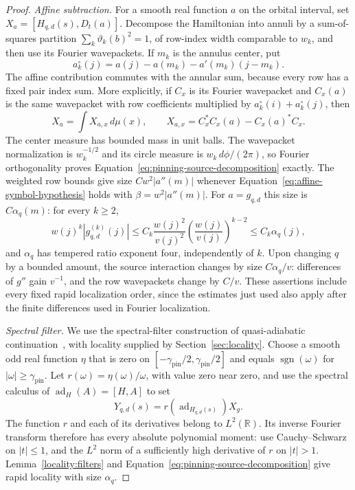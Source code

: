 \begin{proof}
\emph{Affine subtraction.}
For a smooth real
function $a$ on the orbital interval, set
$X_a=[H_{q,d}(s),D_t(a)]$.  Decompose the Hamiltonian into annuli by a
sum-of-squares partition $\sum_k\vartheta_k(b)^2=1$, of row-index width
comparable to $w_k$, and then use its Fourier wavepackets.  If $m_k$ is
the annulus center, put
\[
 a_k^\circ(j)=a(j)-a(m_k)-a'(m_k)(j-m_k).
\]
The affine contribution commutes with the annular sum, because every row
has a fixed pair index sum.  More explicitly, if $C_x$ is its Fourier
wavepacket and $C_x(a)$ is the same wavepacket with row coefficients
multiplied by $a_k^\circ(i)+a_k^\circ(j)$, then
\begin{equation}
 X_a=\int X_{a,x}\,d\mu(x),\qquad
 X_{a,x}=C_x^*C_x(a)-C_x(a)^*C_x.
 \label{eq:pinning-source-decomposition}
\end{equation}
The center measure has bounded mass in unit balls.  The wavepacket
normalization is $w_k^{-1/2}$ and its circle measure is
$w_k\,d\phi/(2\pi)$, so Fourier orthogonality proves
Equation~\eqref{eq:pinning-source-decomposition} exactly.
The weighted row bounds give size $Cw^2|a''(m)|$ whenever
Equation~\eqref{eq:affine-symbol-hypothesis} holds with
$\beta=w^2|a''(m)|$.  For $a=g_{q,d}$ this size is $C\alpha_q(m)$:
for every $k\ge2$,
\[
 w(j)^k|g_{q,d}^{(k)}(j)|
 \le C_k\frac{w(j)^2}{v(j)^2}
                \left(\frac{w(j)}{v(j)}\right)^{k-2}
 \le C_k\alpha_q(j),
\]
and $\alpha_q$ has tempered ratio exponent four, independently of $k$.
Upon changing $q$ by a bounded amount, the source interaction changes by
size $C\alpha_q/v$: differences of $g''$ gain $v^{-1}$, and the row
wavepackets change by $C/v$.  These assertions include every fixed rapid
localization order, since the estimates just used also apply after the
finite differences used in Fourier localization.

\emph{Spectral filter.}
We use the spectral-filter construction of quasi-adiabatic
continuation~\cite{HW,BMNS}, with locality supplied by Section~\ref{sec:locality}.
Choose a smooth odd real function $\eta$ that is zero on
$[-\gamma_{\mathrm{pin}}/2,\gamma_{\mathrm{pin}}/2]$ and equals
$\operatorname{sgn}(\omega)$ for $|\omega|\ge\gamma_{\mathrm{pin}}$.
Let $r(\omega)=\eta(\omega)/\omega$, with value zero near zero, and use
the spectral calculus of $\operatorname{ad}_{H}(A)=[H,A]$ to set
\[
 Y_{q,d}(s)=r(\operatorname{ad}_{H_{q,d}(s)})X_g.
\]
The function $r$ and each of its derivatives belong to $L^2(\mathbb R)$.
Its inverse Fourier transform therefore has every absolute polynomial
moment: use Cauchy--Schwarz on $|t|\le1$, and the $L^2$ norm of a
sufficiently high derivative of $r$ on $|t|>1$.  Lemma~\ref{locality:filters}
and Equation~\eqref{eq:pinning-source-decomposition} give rapid locality
with size $\alpha_q$.


\end{proof}
